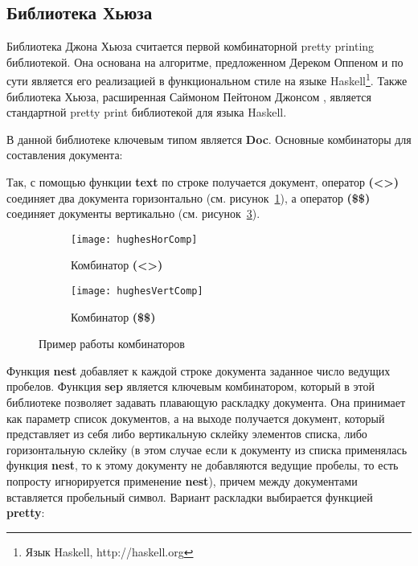 \subsection{Библиотека Хьюза}

Библиотека Джона Хьюза\cite{hughes} считается первой комбинаторной pretty printing библиотекой. Она основана на алгоритме, предложенном Дереком Оппеном \cite{oppen} и по сути является его реализацией в функциональном стиле на языке Haskell\footnote{Язык Haskell, http://haskell.org}. Также библиотека Хьюза, расширенная Саймоном Пейтоном Джонсом \cite{peytonJones}, является стандартной pretty print библиотекой для языка Haskell.


В данной библиотеке ключевым типом является \textbf{Doc}. Основные комбинаторы для составления документа:


Так, с помощью функции \textbf{text} по строке получается документ, оператор \textbf{(<>)} соединяет два документа горизонтально (см. рисунок~\ref{fig:hughesHorComp}), а оператор \textbf{(\$\$)} соединяет документы вертикально (см. рисунок~\ref{fig:hughesVertComp}).

\begin{figure}[ht]
	\begin{subfigure}[b]{0.45\linewidth}
		\centering
		\texttt{[image: hughesHorComp]}
		\caption{Комбинатор \textbf{(<>)}}
		\label{fig:hughesHorComp}
	\end{subfigure}
	\hspace{0.5cm}
	\begin{subfigure}[b]{0.45\linewidth}
		\centering
		\texttt{[image: hughesVertComp]}
		\caption{Комбинатор \textbf{(\$\$)}}
		\label{fig:hughesVertComp}
	\end{subfigure}

	\caption{Пример работы комбинаторов}
\end{figure}

Функция \textbf{nest} добавляет к каждой строке документа заданное число ведущих пробелов. Функция \textbf{sep} является ключевым комбинатором, который в этой библиотеке позволяет задавать плавающую раскладку документа. Она принимает как параметр список документов, а на выходе получается документ, который представляет из себя либо вертикальную склейку элементов списка, либо горизонтальную склейку (в этом случае если к документу из списка применялась функция \textbf{nest}, то к этому документу не добавляются ведущие пробелы, то есть попросту игнорируется применение \textbf{nest}), причем между документами вставляется пробельный символ. Вариант раскладки выбирается функцией \textbf{pretty}:

